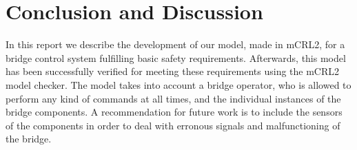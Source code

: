 \section{Conclusion and Discussion}
\label{sec:conclusion}

In this report we describe the development of our model, made in mCRL2, for a bridge control system fulfilling basic safety requirements. Afterwards, this model has been successfully verified for meeting these requirements using the mCRL2 model checker. The model takes into account a bridge operator, who is allowed to perform any kind of commands at all times, and the individual instances of the bridge components. A recommendation for future work is to include the sensors of the components in order to deal with erronous signals and malfunctioning of the bridge.
